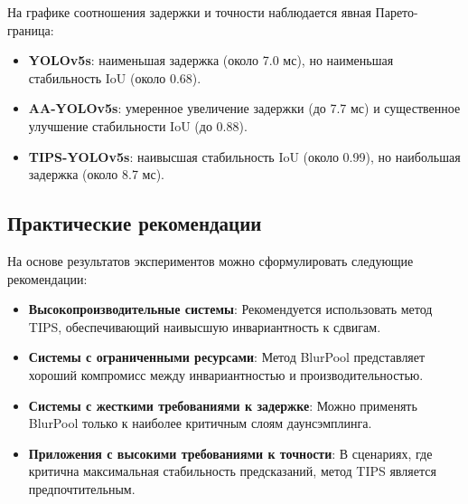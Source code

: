 На графике соотношения задержки и точности наблюдается явная Парето-граница:
\begin{itemize}
    \item \textbf{YOLOv5s}: наименьшая задержка (около 7.0 мс), но наименьшая стабильность IoU (около 0.68).
    \item \textbf{AA-YOLOv5s}: умеренное увеличение задержки (до 7.7 мс) и существенное улучшение стабильности IoU (до 0.88).
    \item \textbf{TIPS-YOLOv5s}: наивысшая стабильность IoU (около 0.99), но наибольшая задержка (около 8.7 мс).
\end{itemize}

\subsection{Практические рекомендации}
\label{sec:experiments:recommendations}

На основе результатов экспериментов можно сформулировать следующие рекомендации:

\begin{itemize}
    \item \textbf{Высокопроизводительные системы}: Рекомендуется использовать метод TIPS, обеспечивающий наивысшую инвариантность к сдвигам.
    \item \textbf{Системы с ограниченными ресурсами}: Метод BlurPool представляет хороший компромисс между инвариантностью и производительностью.
    \item \textbf{Системы с жесткими требованиями к задержке}: Можно применять BlurPool только к наиболее критичным слоям даунсэмплинга.
    \item \textbf{Приложения с высокими требованиями к точности}: В сценариях, где критична максимальная стабильность предсказаний, метод TIPS является предпочтительным.
\end{itemize}

\newpage
